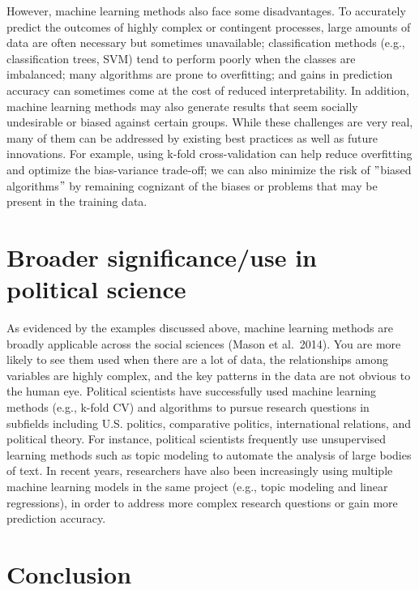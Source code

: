 \documentclass{book}
\begin{document}
However, machine learning methods also face some disadvantages. To accurately
predict the outcomes of highly complex or contingent processes, large amounts
of data are often necessary but sometimes unavailable; classification methods
(e.g., classification trees, SVM) tend to perform poorly when the classes are
imbalanced; many algorithms are prone to overfitting; and gains in prediction
accuracy can sometimes come at the cost of reduced interpretability. In
addition, machine learning methods may also generate results that seem
socially undesirable or biased against certain groups. While these challenges
are very real, many of them can be addressed by existing best practices as
well as future innovations. For example, using k-fold cross-validation can
help reduce overfitting and optimize the bias-variance trade-off; we can also
minimize the risk of \("\)biased algorithms\("\) by remaining cognizant of the
biases or problems that may be present in the training data.

\hypertarget{broader-significanceuse-in-political-science-5}{%
\section{Broader significance/use in political
science}\label{broader-significanceuse-in-political-science-5}}

As evidenced by the examples discussed above, machine learning methods are
broadly applicable across the social sciences (Mason et al.~2014). You are
more likely to see them used when there are a lot of data, the relationships
among variables are highly complex, and the key patterns in the data are not
obvious to the human eye. Political scientists have successfully used machine
learning methods (e.g., k-fold CV) and algorithms to pursue research questions
in subfields including U.S. politics, comparative politics, international
relations, and political theory. For instance, political scientists frequently
use unsupervised learning methods such as topic modeling to automate the
analysis of large bodies of text. In recent years, researchers have also been
increasingly using multiple machine learning models in the same project (e.g.,
topic modeling and linear regressions), in order to address more complex
research questions or gain more prediction accuracy.

\hypertarget{conclusion-8}{%
\section{Conclusion}\label{conclusion-8}}
\end{document}
